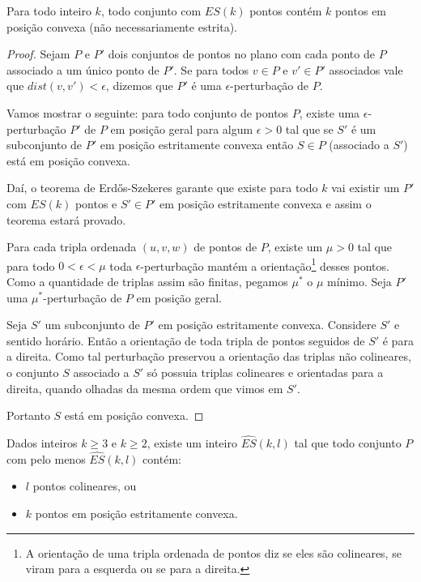 \begin{teorema}\label{EScolinear}
    Para todo inteiro $k$, todo conjunto com $ES(k)$ pontos contém $k$ pontos em posição convexa (não necessariamente estrita).
\end{teorema}
\begin{proof}
    Sejam $P$ e $P'$ dois conjuntos de pontos no plano com cada ponto de $P$ associado a um único ponto de $P'$. Se para todos $v\in P$ e $v'\in P'$ associados vale que $dist(v,v')<\epsilon$, dizemos que $P'$ é uma $\epsilon$-perturbação de $P$.

    Vamos mostrar o seguinte: para todo conjunto de pontos $P$, existe uma $\epsilon$-perturbação $P'$ de $P$ em posição geral para algum $\epsilon>0$ tal que se $S'$ é um subconjunto de $P'$ em posição estritamente convexa então $S\in P$ (associado a $S'$) está em posição convexa.

    Daí, o teorema de Erd\H os-Szekeres garante que existe para todo $k$ vai existir um $P'$ com $ES(k)$ pontos e $S'\in P'$ em posição estritamente convexa e assim o teorema estará provado.
    
    Para cada tripla ordenada $(u,v,w)$ de pontos de $P$, existe um $\mu>0$ tal que para todo $0<\epsilon<\mu$ toda $\epsilon$-perturbação mantém a orientação\footnote{A orientação de uma tripla ordenada de pontos diz se eles são colineares, se viram para a esquerda ou se para a direita.} desses pontos. Como a quantidade de triplas assim são finitas, pegamos $\mu^*$ o $\mu$ mínimo. Seja $P'$ uma $\mu^*$-perturbação de $P$ em posição geral.

    Seja $S'$ um subconjunto de $P'$ em posição estritamente convexa. Considere $S'$ e sentido horário. Então a orientação de toda tripla de pontos seguidos de $S'$ é para a direita. Como tal perturbação preservou a orientação das triplas não colineares, o conjunto $S$ associado a $S'$ só possuia triplas colineares e orientadas para a direita, quando olhadas da mesma ordem que vimos em $S'$.

    Portanto $S$ está em posição convexa.
\end{proof}
\begin{teorema}
    Dados inteiros $k\geq 3$ e $k\geq 2$, existe um inteiro $\widehat{ES}(k,l)$ tal que todo conjunto $P$ com pelo menos $\widehat{ES}(k,l)$ contém:
    \begin{itemize}
        \item $l$ pontos colineares, ou
        \item $k$ pontos em posição estritamente convexa.
    \end{itemize}
\end{teorema}
